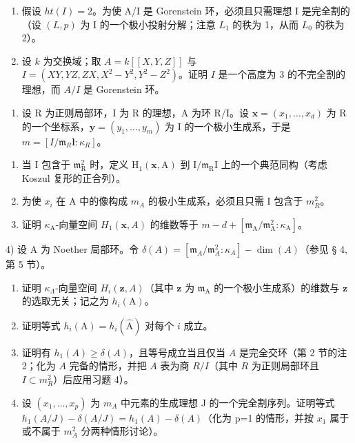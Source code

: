\begin{enumerate}
\def\labelenumi{\alph{enumi})}
\setcounter{enumi}{1}
\item
  假设 \(ht(I)=2\)。为使 A/I 是 Gorenstein 环，必须且只需理想 I 是完全割的（设 \((L,p)\) 为 I 的一个极小投射分解；注意 \(L_{1}\) 的秩为 1，从而 \(L_{0}\) 的秩为 2）。
\item
  设 \(k\) 为交换域；取 \(A = k[[X,Y,Z]]\) 与 \(I = (XY,YZ,ZX, X^2 - Y^2, Y^2 - Z^2)\)。证明 \(I\) 是一个高度为 3 的不完全割的理想，而 \(A/I\) 是 Gorenstein 环。
\end{enumerate}

\begin{enumerate}
\def\labelenumi{\arabic{enumi})}
\setcounter{enumi}{2}
\tightlist
\item
  设 R 为正则局部环，I 为 R 的理想，A 为环 R/I。设 \(\mathbf{x} = (x_{1}, \ldots, x_{d})\) 为 R 的一个坐标系，\(\mathbf{y} = (y_{1}, \ldots, y_{m})\) 为 I 的一个极小生成系，于是 \(m = [I/\mathfrak{m}_{R}\mathbf{l} : \kappa_{R}]\)。
\end{enumerate}

\begin{enumerate}
\def\labelenumi{\alph{enumi})}
\item
  当 I 包含于 \(\mathfrak{m}_{\mathrm{R}}^{2}\) 时，定义 \(\mathrm{H}_1(\mathbf{x},\mathrm{A})\) 到 \(\mathrm{I} / \mathfrak{m}_{\mathrm{R}}\mathrm{I}\) 上的一个典范同构（考虑 Koszul 复形的正合列）。
\item
  为使 \(x_{i}\) 在 A 中的像构成 \(m_{A}\) 的极小生成系，必须且只需 I 包含于 \(m_{R}^{2}\)。
\item
  证明 \(\kappa_{\mathrm{A}}\)-向量空间 \(H_1(\mathbf{x}, A)\) 的维数等于 \(m - d + [\mathfrak{m}_{\mathrm{A}} / \mathfrak{m}_{\mathrm{A}}^{2} : \kappa_{\mathrm{A}}]\)。
\end{enumerate}

4) 设 A 为 Noether 局部环。令 \(\delta(A) = [\mathfrak{m}_{A}/\mathfrak{m}_{A}^{2}:\kappa_{A}] - \dim(A)\)（参见 § 4, 第 5 节）。

\begin{enumerate}
\def\labelenumi{\alph{enumi})}
\item
  证明 \(\kappa_{\Lambda}\)-向量空间 \(H_{i}(\mathbf{z}, A)\)（其中 \(\mathbf{z}\) 为 \(\mathfrak{m}_{\mathrm{A}}\) 的一个极小生成系）的维数与 \(\mathbf{z}\) 的选取无关；记之为 \(h_{i}(\mathrm{A})\)。
\item
  证明等式 \(h_i(\mathrm{A}) = h_i(\widehat{\mathrm{A}})\) 对每个 \(i\) 成立。
\item
  证明有 \(h_1(A) \geqslant \delta(A)\)，且等号成立当且仅当 \(A\) 是完全交环（第 2 节的注 2；化为 \(A\) 完备的情形，并把 \(A\) 表为商 \(R/I\)（其中 \(R\) 为正则局部环且 \(I \subset m_R^2\)）后应用习题 4）。
\item
  设 \((x_{1},\ldots,x_{p})\) 为 \(m_{A}\) 中元素的生成理想 J 的一个完全割序列。证明等式 \(h_{1}(A/J)-\delta(A/J)=h_{1}(A)-\delta(A)\)（化为 p=1 的情形，并按 \(x_{1}\) 属于或不属于 \(m_{A}^{2}\) 分两种情形讨论）。
\end{enumerate}


